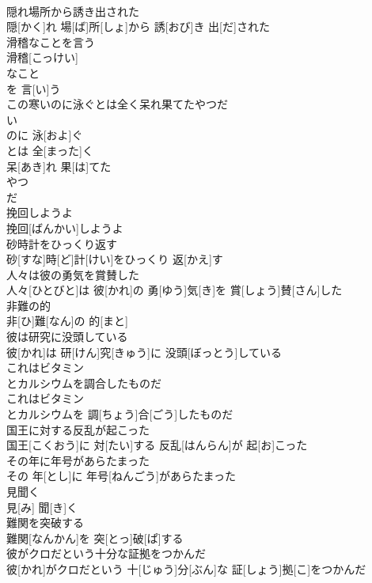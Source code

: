 \documentclass[8pt]{extreport}
\begin{document}
\begin{CJK}{UTF8}{min}
\\	隠れ場所から誘き出された	
\\	隠[かく]れ 場[ば]所[しょ]から 誘[おび]き 出[だ]された
\\	滑稽なことを言う	
\\	滑稽[こっけい]
\\	なこと 
\\	を 言[い]う 
\\	この寒いのに泳ぐとは全く呆れ果てたやつだ	
\\	[｟口｠
\\	この 
\\	寒[さむ]い 
\\	のに 泳[およ]ぐ 
\\	とは 全[まった]く 
\\	呆[あき]れ 果[は]てた 
\\	やつ 
\\	だ
\\	挽回しようよ	
\\	挽回[ばんかい]しようよ
\\	砂時計をひっくり返す	
\\	砂[すな]時[ど]計[けい]をひっくり 返[かえ]す
\\	人々は彼の勇気を賞賛した	
\\	人々[ひとびと]は 彼[かれ]の 勇[ゆう]気[き]を 賞[しょう]賛[さん]した
\\	非難の的	
\\	非[ひ]難[なん]の 的[まと]
\\	彼は研究に没頭している	
\\	彼[かれ]は 研[けん]究[きゅう]に 没頭[ぼっとう]している
\\	これはビタミン
\\	とカルシウムを調合したものだ	
\\	これはビタミン 
\\	とカルシウムを 調[ちょう]合[ごう]したものだ
\\	国王に対する反乱が起こった	
\\	国王[こくおう]に 対[たい]する 反乱[はんらん]が 起[お]こった
\\	その年に年号があらたまった	
\\	その 年[とし]に 年号[ねんごう]があらたまった
\\	見聞く	
\\	見[み] 聞[き]く
\\	難関を突破する	
\\	難関[なんかん]を 突[とっ]破[ぱ]する
\\	彼がクロだという十分な証拠をつかんだ	
\\	彼[かれ]がクロだという 十[じゅう]分[ぶん]な 証[しょう]拠[こ]をつかんだ

\end{CJK}
\end{document}
